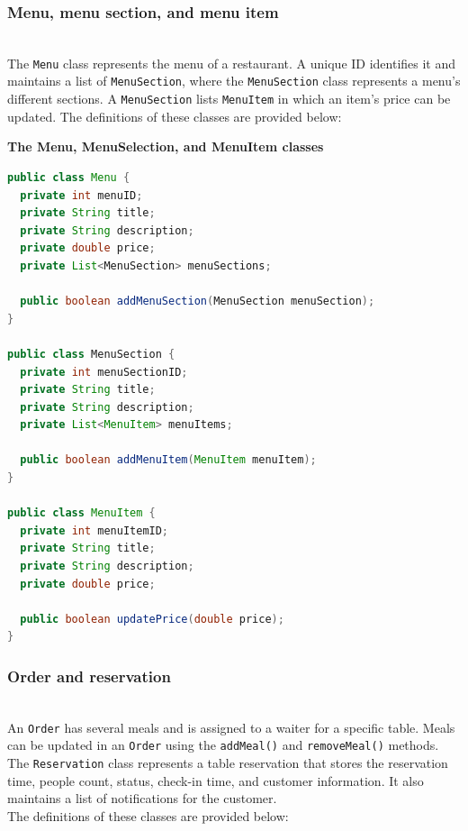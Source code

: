 \subsubsection{Menu, menu section, and menu item}\label{Lsjlv7LQslHBLlSq8d2Ti}
\\
The \texttt{Menu} class represents the menu of a restaurant. A unique ID identifies it and maintains a list of \texttt{MenuSection}, where the \texttt{MenuSection} class represents a menu's different sections. A \texttt{MenuSection} lists \texttt{MenuItem} in which an item's price can be updated. The definitions of these classes are provided below:

\textbf{The Menu, MenuSelection, and MenuItem classes}

\begin{lstlisting}[language=Java]
public class Menu {
  private int menuID;
  private String title;
  private String description;
  private double price;
  private List<MenuSection> menuSections;

  public boolean addMenuSection(MenuSection menuSection);
}

public class MenuSection {
  private int menuSectionID;
  private String title;
  private String description;
  private List<MenuItem> menuItems;

  public boolean addMenuItem(MenuItem menuItem);
}

public class MenuItem {
  private int menuItemID;
  private String title;
  private String description;
  private double price;

  public boolean updatePrice(double price);
}
\end{lstlisting}

\subsubsection{Order and reservation}\label{MQ1UuWrB4BVQVlVT0bQaH}
\\
An \texttt{Order} has several meals and is assigned to a waiter for a specific table. Meals can be updated in an \texttt{Order} using the \texttt{addMeal()} and \texttt{removeMeal()} methods.
\\
The \texttt{Reservation} class represents a table reservation that stores the reservation time, people count, status, check-in time, and customer information. It also maintains a list of notifications for the customer.
\\
The definitions of these classes are provided below:

